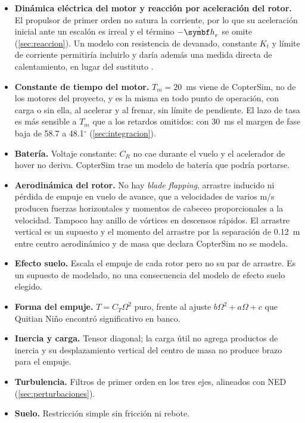 \begin{itemize}
\item \textbf{Dinámica eléctrica del motor y reacción por aceleración del
rotor.} El propulsor de primer orden no satura la corriente, por lo que su
aceleración inicial ante un escalón es irreal y el término $-\dot{\vect h}_r$
se omite (\cref{sec:reaccion}). Un modelo con resistencia de devanado,
constante $K_t$ y límite de corriente permitiría incluirlo y daría además
una medida directa de calentamiento, en lugar del sustituto
.
\item \textbf{Constante de tiempo del motor.} $T_m=20$~ms viene de
CopterSim, no de los motores del proyecto, y es la misma en todo punto de
operación, con carga o sin ella, al acelerar y al frenar, sin límite de
pendiente. El lazo de tasa es más sensible a $T_m$ que a los retardos
omitidos: con 30~ms el margen de fase baja de 58.7 a 48.1$^\circ$
(\cref{sec:integracion}).
\item \textbf{Batería.} Voltaje constante: $C_R$ no cae durante el vuelo y
el acelerador de hover no deriva. CopterSim trae un modelo de batería que
podría portarse.
\item \textbf{Aerodinámica del rotor.} No hay \emph{blade flapping}, arrastre
inducido ni pérdida de empuje en vuelo de avance, que a velocidades de
varios m/s producen fuerzas horizontales y momentos de cabeceo
proporcionales a la velocidad. Tampoco hay anillo de vórtices en descensos
rápidos. El arrastre vertical es un supuesto y el momento del arrastre por
la separación de 0.12~m entre centro aerodinámico y de masa que declara
CopterSim no se modela.
\item \textbf{Efecto suelo.} Escala el empuje de cada rotor pero no su par
de arrastre. Es un supuesto de modelado, no una consecuencia del modelo de
efecto suelo elegido.
\item \textbf{Forma del empuje.} $T=C_T\Omega^2$ puro, frente al ajuste
$b\Omega^2+a\Omega+c$ que Quitian Niño \cite{quitian22} encontró
significativo en banco.
\item \textbf{Inercia y carga.} Tensor diagonal; la carga útil no agrega
productos de inercia y su desplazamiento vertical del centro de masa no
produce brazo para el empuje.
\item \textbf{Turbulencia.} Filtros de primer orden en los tres ejes,
alineados con NED (\cref{sec:perturbaciones}).
\item \textbf{Suelo.} Restricción simple sin fricción ni rebote.
\end{itemize}

